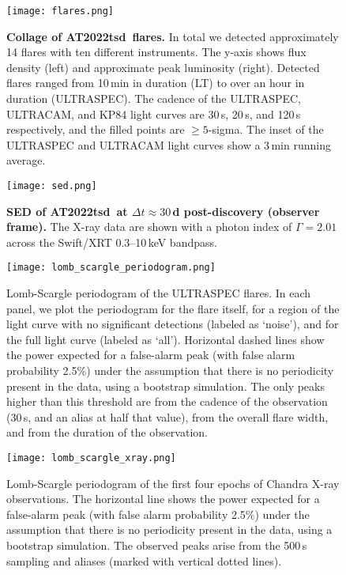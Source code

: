 \documentclass{nature_plusfigure}
\newcommand{\at}{AT2022tsd}
\begin{document}
\begin{extended_data}
\begin{figure}[ht]
 \centering
\texttt{[image: flares.png]}
  \caption{\textbf{Collage of \at\ flares.} In total we detected approximately 14 flares with ten different instruments. The y-axis shows flux density (left) and approximate peak luminosity (right). Detected flares ranged from 10\,min in duration (LT) to over an hour in duration (ULTRASPEC). The cadence of the ULTRASPEC, ULTRACAM, and KP84 light curves are 30\,s, 20\,s, and 120\,s respectively, and the filled points are $\geq5$-sigma. The inset of the ULTRASPEC and ULTRACAM light curves show a 3\,min running average.}
 \label{fig:flare-collage}
\end{figure}

\begin{figure}[!ht]
 \centering
\texttt{[image: sed.png]}
  \caption{\textbf{SED of \at\ at $\Delta t\approx30\,$d post-discovery (observer frame).} The X-ray data are shown with a photon index of $\Gamma=2.01$ across the Swift/XRT 0.3--10\,keV bandpass.}
 \label{fig:full-sed}
\end{figure}

\begin{figure*}[ht]
    \centering
    \texttt{[image: lomb\_scargle\_periodogram.png]}
    \caption{Lomb-Scargle periodogram of the ULTRASPEC flares. In each panel, we plot the periodogram for the flare itself, for a region of the light curve with no significant detections (labeled as `noise'), and for the full light curve (labeled as `all'). Horizontal dashed lines show the power expected for a false-alarm peak (with false alarm probability 2.5\%) under the assumption that there is no periodicity present in the data, using a bootstrap simulation. The only peaks higher than this threshold are from the cadence of the observation (30\,s, and an alias at half that value), from the overall flare width, and from the duration of the observation.}
    \label{fig:ultraspec-periodogram}
\end{figure*}

\begin{figure*}[!ht]
    \centering
    \texttt{[image: lomb\_scargle\_xray.png]}
    \caption{Lomb-Scargle periodogram of the first four epochs of Chandra X-ray observations. The horizontal line shows the power expected for a false-alarm peak (with false alarm probability 2.5\%) under the assumption that there is no periodicity present in the data, using a bootstrap simulation. The observed peaks arise from the 500\,s sampling and aliases (marked with vertical dotted lines).}
    \label{fig:xray-periodogram}
\end{figure*}


\end{extended_data}
\end{document}
